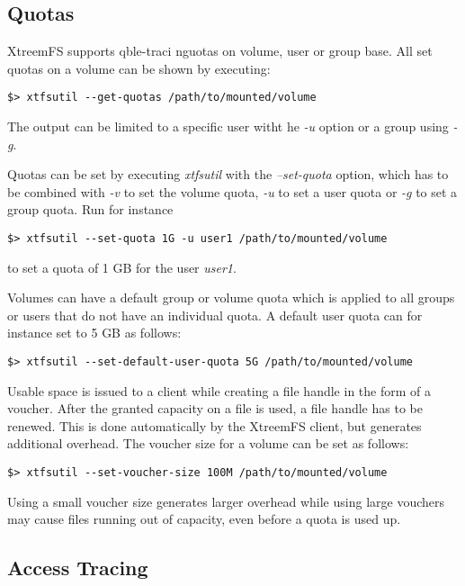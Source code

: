 \documentclass[a4paper,10pt]{book}
\begin{document}
\subsection{Quotas}

XtreemFS supports qble-traci  nguotas on volume, user or group base. All set quotas on a
volume can be shown by executing:

\begin{verbatim}
$> xtfsutil --get-quotas /path/to/mounted/volume
\end{verbatim}

The output can be limited to a specific user witht he \emph{-u} option or a
group using \emph{-g}.

Quotas can be set by executing \emph{xtfsutil} with the \emph{--set-quota}
option, which has to be combined with \emph{-v} to set the volume quota,
\emph{-u} to set a user quota or \emph{-g} to set a group quota. Run for
instance

\begin{verbatim}
$> xtfsutil --set-quota 1G -u user1 /path/to/mounted/volume
\end{verbatim}

to set a quota of 1 GB for the user \emph{user1}.

Volumes can have a default group or volume quota which is applied to all groups
or users that do not have an individual quota. A default user quota can for
instance set to 5 GB as follows:

\begin{verbatim}
$> xtfsutil --set-default-user-quota 5G /path/to/mounted/volume
\end{verbatim}

Usable space is issued to a client while creating a file handle in the form of a
voucher. After the granted capacity on a file is used, a file handle has to be
renewed. This is done automatically by the XtreemFS client, but generates
additional overhead. The voucher size for a volume can be set as follows:

\begin{verbatim}
$> xtfsutil --set-voucher-size 100M /path/to/mounted/volume
\end{verbatim}

Using a small voucher size generates larger overhead while using large vouchers
may cause files running out of capacity, even before a quota is used up.

\subsection{Access Tracing}
\end{document}
